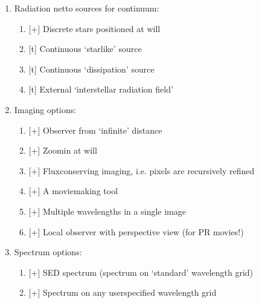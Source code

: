 \documentclass[letterpaper,10pt,english]{sphinxmanual}
\begin{document}
\begin{enumerate}
\begin{quote}
\begin{enumerate}
\end{enumerate}
\end{quote}

\item {} 
Radiation netto sources for continuum:
\begin{enumerate}
%
\item {} 
{[}+{]} Discrete stars positioned at will

\item {} 
{[}t{]} Continuous ‘starlike’ source

\item {} 
{[}t{]} Continuous ‘dissipation’ source

\item {} 
{[}t{]} External ‘interstellar radiation field’

\end{enumerate}

\item {} 
Imaging options:
\begin{enumerate}
%
\item {} 
{[}+{]} Observer from ‘infinite’ distance

\item {} 
{[}+{]} Zoom\sphinxhyphen{}in at will

\item {} 
{[}+{]} Flux\sphinxhyphen{}conserving imaging, i.e. pixels are recursively refined

\item {} 
{[}+{]} A movie\sphinxhyphen{}making tool

\item {} 
{[}+{]} Multiple wavelengths in a single image

\item {} 
{[}+{]} Local observer with perspective view (for PR movies!)

\end{enumerate}

\item {} 
Spectrum options:
\begin{enumerate}
%
\item {} 
{[}+{]} SED spectrum (spectrum on ‘standard’ wavelength grid)

\item {} 
{[}+{]} Spectrum on any user\sphinxhyphen{}specified wavelength grid


\end{enumerate}
\end{enumerate}
\end{document}
